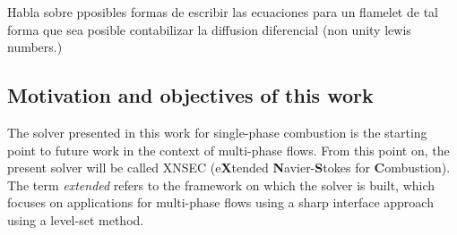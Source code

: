 \textcite{pitschConsistentFlameletFormulation1998} Habla sobre pposibles formas de escribir las ecuaciones para un flamelet de tal forma que sea posible contabilizar la diffusion diferencial (non unity lewis numbers.)







\subsection{Motivation and objectives of this work}

The solver presented in this work for single-phase combustion is the starting point to future work in the context of multi-phase flows. From this point on, the present solver will be called XNSEC (e\textbf{X}tended \textbf{N}avier-\textbf{S}tokes for \textbf{C}ombustion). The term \textit{extended} refers to the framework on which the solver is built, which focuses on applications for multi-phase flows using a sharp interface approach using a level-set method. 

